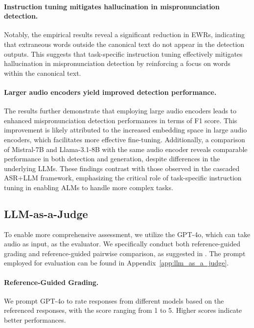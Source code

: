 \documentclass[11pt]{article}
\begin{document}
\paragraph{Instruction tuning mitigates hallucination in mispronunciation detection.} Notably, the empirical results reveal a significant reduction in EWRs, indicating that extraneous words outside the canonical text do not appear in the detection outputs. This suggests that task-specific instruction tuning effectively mitigates hallucination in mispronunciation detection by reinforcing a focus on words within the canonical text. 

\paragraph{Larger audio encoders yield improved detection performance.} The results further demonstrate that employing large audio encoders leads to enhanced mispronunciation detection performances in terms of F1 score. This improvement is likely attributed to the increased embedding space in large audio encoders, which facilitates more effective fine-tuning. Additionally, a comparison of Mistral-7B and Llama-3.1-8B with the same audio encoder reveals comparable performance in both detection and generation, despite differences in the underlying LLMs. These findings contrast with those observed in the cascaded ASR+LLM framework, emphasizing the critical role of task-specific instruction tuning in enabling ALMs to handle more complex tasks.   

\subsection{LLM-as-a-Judge}
\label{sec:llm_judge}
To enable more comprehensive assessment, we utilize the GPT-4o, which can take audio as input, as the evaluator. We specifically conduct both reference-guided grading and reference-guided pairwise comparison, as suggested in \citet{zheng2023judging}. The prompt employed for evaluation can be found in Appendix~\ref{app:llm_as_a_judge}.

\paragraph{Reference-Guided Grading.} We prompt GPT-4o to rate responses from different models based on the referenced responses, with the score ranging from 1 to 5. Higher scores indicate better performances. 
\end{document}

